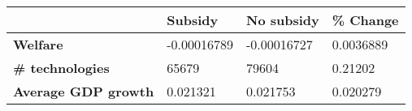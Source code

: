 \begin{tabular}{|l|l|l|l|}
\hline
&\textbf{Subsidy}&\textbf{No subsidy}&\textbf{\% Change}\\\hline
\textbf{Welfare}&-0.00016789&-0.00016727&0.0036889\\\hline
\textbf{\# technologies}&65679&79604&0.21202\\\hline
\textbf{Average GDP growth}&0.021321&0.021753&0.020279\\\hline
\end{tabular}
